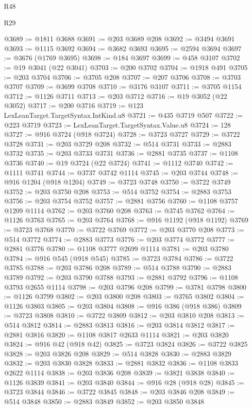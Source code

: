 \begin{lexlean}{R48}
\begin{lexlean}{R29}
\begin{coremodule}
{{{{{{{{{{{{{{{{{{{{{{{{{{{{{{{{{{{{{{{{{{{{{{{{{{{{{{{{{{{{{{{{{{{{{{{{{{{{{{{{{{{{{{{{{{{{{{{{{{{{{{{{{{{{{{{{{{{{{{{{{{{{{{{{{{{{{{{{{{{{{{{{{{{{{{{{{{{{{{{{{{{{{{{{{{{{{{{{{{{{{{{{{{{{{{{{{{{{{{{{{{{{{{{{{{{{{{{{{{@3689 := @1811 @3688
@3691 := @203 @3689 @208
@3692 := @3494 @3691
@3693 := @1115 @3692
@3694 := @3682 @3693
@3695 := @2594 @3694
@3697 := @3676 (@1769 @3695)
@3698 := @184 @3697
@3699 := @458 @3107
@3702 := @19 @3041 (@22 @3041)
@3703 := @200 @3702
@3704 := @1918 @491
@3705 := @203 @3704
@3706 := @3705 @208
@3707 := @207 @3706
@3708 := @3703 @3707
@3709 := @3699 @3708
@3710 := @3176 @3107
@3711 := @3705 @1154
@3712 := @1126 @3711
@3713 := @203 @3712
@3716 := @19 @3052 (@22 @3052)
@3717 := @200 @3716
@3719 := @123 LexLeanTarget.TargetSyntax.IntKind.u8
@3721 := @435 @3719 @507
@3722 := @223 @3719
@3723 := LexLeanTarget.TargetSyntax.Value.u8
@3724 := 128
@3727 := @916 @3724 (@918 @3724)
@3728 := @3723 @3727
@3729 := @3722 @3728
@3731 := @203 @3729 @208
@3732 := @514 @3731
@3733 := @2883 @3732
@3735 := @203 @3733 @3731
@3736 := @2881 @3735
@3737 := @1108 @3736
@3740 := @19 @3724 (@22 @3724)
@3741 := @1112 @3740
@3742 := @1111 @3741
@3744 := @3737 @3742 @1114
@3745 := @203 @3744
@3748 := @916 @1204 (@918 @1204)
@3749 := @3723 @3748
@3750 := @3722 @3749
@3752 := @203 @3750 @208
@3753 := @514 @3752
@3754 := @2883 @3753
@3756 := @203 @3754 @3752
@3757 := @2881 @3756
@3760 := @1108 @3757 @1209 @1114
@3762 := @203 @3760 @208
@3763 := @3745 @3762
@3764 := @1126 @3763
@3765 := @203 @3764
@3768 := @916 @1192 (@918 @1192)
@3769 := @3723 @3768
@3770 := @3722 @3769
@3772 := @203 @3770 @208
@3773 := @514 @3772
@3774 := @2883 @3773
@3776 := @203 @3774 @3772
@3777 := @2881 @3776
@3780 := @1108 @3777 @2699 @1114
@3781 := @203 @3780
@3784 := @916 @545 (@918 @545)
@3785 := @3723 @3784
@3786 := @3722 @3785
@3788 := @203 @3786 @208
@3789 := @514 @3788
@3790 := @2883 @3789
@3792 := @203 @3790 @3788
@3793 := @2881 @3792
@3796 := @1108 @3793 @2655 @1114
@3798 := @203 @3796 @208
@3799 := @3781 @3798
@3800 := @1126 @3799
@3802 := @203 @3800 @208
@3803 := @3765 @3802
@3804 := @1126 @3803
@3805 := @203 @3804
@3808 := @916 @386 (@918 @386)
@3809 := @3723 @3808
@3810 := @3722 @3809
@3812 := @203 @3810 @208
@3813 := @514 @3812
@3814 := @2883 @3813
@3816 := @203 @3814 @3812
@3817 := @2881 @3816
@3820 := @1108 @3817 @2633 @1114
@3821 := @203 @3820
@3824 := @916 @42 (@918 @42)
@3825 := @3723 @3824
@3826 := @3722 @3825
@3828 := @203 @3826 @208
@3829 := @514 @3828
@3830 := @2883 @3829
@3832 := @203 @3830 @3828
@3833 := @2881 @3832
@3836 := @1108 @3833 @2622 @1114
@3838 := @203 @3836 @208
@3839 := @3821 @3838
@3840 := @1126 @3839
@3841 := @203 @3840
@3844 := @916 @28 (@918 @28)
@3845 := @3723 @3844
@3846 := @3722 @3845
@3848 := @203 @3846 @208
@3849 := @514 @3848
@3850 := @2883 @3849
@3852 := @203 @3850 @3848
}}}}}}}}}}}}}}}}}}}}}}}}}}}}}}}}}}}}}}}}}}}}}}}}}}}}}}}}}}}}}}}}}}}}}}}}}}}}}}}}}}}}}}}}}}}}}}}}}}}}}}}}}}}}}}}}}}}}}}}}}}}}}}}}}}}}}}}}}}}}}}}}}}}}}}}}}}}}}}}}}}}}}}}}}}}}}}}}}}}}}}}}}}}}}}}}}}}}}}}}}}}}}}}}}}}}}}}}}}
\end{coremodule}
\end{lexlean}
\end{lexlean}
